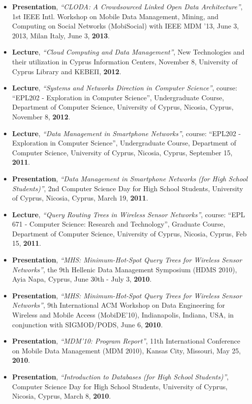 \documentclass[10pt]{article}
\begin{document}
\begin{itemize}
\item  {\bf Presentation}, {\em ``CLODA: A Crowdsourced Linked Open Data Architecture''}, 1st IEEE Intl. Workshop on Mobile Data Management, Mining, and Computing on Social Networks (MobiSocial) with IEEE MDM '13, June 3, 2013, Milan Italy, June 3, {\bf 2013}.
\item  {\bf Lecture}, {\em ``Cloud Computing and Data Management''}, New Technologies and their utilization in Cyprus Information Centers, November 8, University of Cyprus Library and ΚΕΒΕΠ, {\bf 2012}.
\item  {\bf Lecture}, {\em ``Systems and Networks Direction in Computer Science''}, course: ``EPL202 - Exploration in Computer Science'', Undergraduate Course, Department of Computer Science, University of Cyprus,  Nicosia, Cyprus, November 8, {\bf 2012}.
\item  {\bf Lecture}, {\em ``Data Management in Smartphone Networks''}, course: ``EPL202 - Exploration in Computer Science'', Undergraduate Course, Department of Computer Science, University of Cyprus,  Nicosia, Cyprus, September 15, {\bf 2011}.
\item  {\bf Presentation}, {\em ``Data Management in Smartphone Networks (for High School Students)''}, 2nd Computer Science Day for High School Students, University of Cyprus,  Nicosia, Cyprus, March 19, {\bf 2011}.
\item  {\bf Lecture}, {\em ``Query Routing Trees in Wireless Sensor Networks''}, course: ``EPL 671 -  Computer Science: Research and Technology'', Graduate Course, Department of Computer Science, University of Cyprus,  Nicosia, Cyprus, Feb 15, {\bf 2011}.
\item  {\bf Presentation}, {\em ``MHS: Minimum-Hot-Spot Query Trees for Wireless Sensor Networks''}, the 9th Hellenic Data Management Symposium (HDMS 2010), Ayia Napa, Cyprus, June 30th - July 3, {\bf 2010}. 
\item  {\bf Presentation}, {\em ``MHS: Minimum-Hot-Spot Query Trees for Wireless Sensor Networks''}, 9th International ACM Workshop on Data Engineering for Wireless and Mobile Access (MobiDE'10), Indianapolis, Indiana, USA, in conjunction with SIGMOD/PODS, June 6, {\bf 2010}.
\item  {\bf Presentation}, {\em ``MDM'10: Program Report''}, 11th International Conference on Mobile Data Management (MDM 2010), Kansas City, Missouri, May 25, {\bf 2010}.
\item  {\bf Presentation}, {\em ``Introduction to Databases (for High School Students)''}, Computer Science Day for High School Students, University of Cyprus,  Nicosia, Cyprus, March 8, {\bf 2010}.

\end{itemize}
\end{document}
